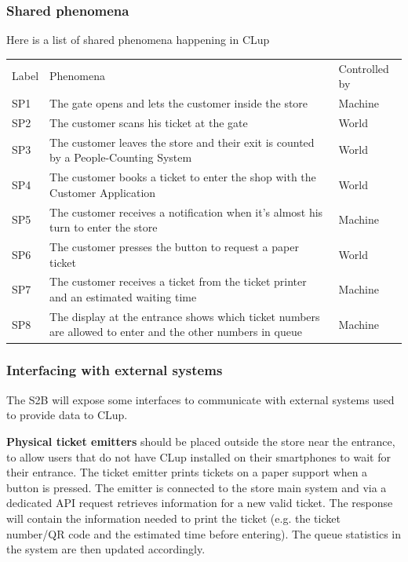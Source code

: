 \subsubsection{Shared phenomena}
Here is a list of shared phenomena happening in CLup

\renewcommand{\arraystretch}{1.4}
\begin{tabular}{C{1cm}L{10.5cm}C{2.6cm}}
    Label & Phenomena                                                                                                  & Controlled by \\
    SP1   & The gate opens and lets the customer inside the store                                                      & Machine       \\
    SP2   & The customer scans his ticket at the gate                                                                  & World         \\
    SP3   & The customer leaves the store and their exit is counted by a People-Counting System                        & World         \\
    SP4   & The customer books a ticket to enter the shop with the Customer Application                                & World         \\
    SP5   & The customer receives a notification when it's almost his turn to enter the store                          & Machine       \\
    SP6   & The customer presses the button to request a paper ticket                                                  & World         \\
    SP7   & The customer receives a ticket from the ticket printer and an estimated waiting time                       & Machine       \\
    SP8   & The display at the entrance shows which ticket numbers are allowed to enter and the other numbers in queue & Machine       \\
\end{tabular}

\subsubsection{Interfacing with external systems}
The S2B will expose some interfaces to communicate with external systems used to provide data to CLup.


\textbf{Physical ticket emitters} should be placed outside the store near the entrance, to allow users that do not have CLup installed on their smartphones to wait for their entrance. The ticket emitter prints tickets on a paper support when a button is pressed. The emitter is connected to the store main system and via a dedicated API request retrieves information for a new valid ticket. The response will contain the information needed to print the ticket (e.g. the ticket number/QR code and the estimated time before entering). The queue statistics in the system are then updated accordingly.

